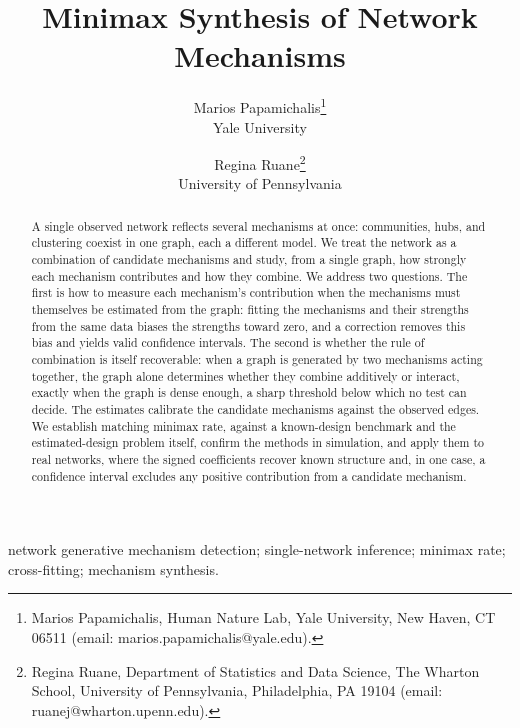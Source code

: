 \documentclass[12pt]{article}
\newif\ifblind\blindfalse %
\newcommand{\1}{\mathbf{1}}
\begin{document}
\sloppy

\singlespacing

\title{Minimax Synthesis of Network Mechanisms}

\ifblind
\author{}
\else
\author{Marios Papamichalis\thanks{Marios Papamichalis, Human Nature Lab, Yale University, New Haven, CT 06511 (email: marios.papamichalis@yale.edu).} \\ Yale University \and Regina Ruane\thanks{Regina Ruane, Department of Statistics and Data Science, The Wharton School, University of Pennsylvania, Philadelphia, PA 19104 (email: ruanej@wharton.upenn.edu).} \\ University of Pennsylvania}
\fi
\date{}


\maketitle

\begin{abstract}%
A single observed network reflects several mechanisms at once: communities, hubs, and clustering coexist in one graph, each a different model. We treat the
network as a combination of candidate mechanisms and study, from a single graph, how strongly each mechanism contributes and how they combine. We address two questions. The first
is how to measure each mechanism's contribution when the mechanisms must themselves be estimated from
the graph: fitting the mechanisms and their strengths from the same data biases the strengths toward zero, and a correction removes this bias and yields valid confidence intervals. The
second is whether the rule of combination is itself recoverable: when a graph is generated by two
mechanisms acting together, the graph alone determines whether they combine additively or interact, exactly when the graph is dense enough, a sharp threshold below which no test can decide. The estimates calibrate the candidate mechanisms against the observed edges. We establish matching minimax rate, against a known-design benchmark and the estimated-design problem itself, confirm the methods in simulation, and apply them to real networks, where the signed coefficients recover known structure and, in one case, a confidence interval excludes any positive contribution from a candidate mechanism.
\end{abstract}

\bigskip{} network generative mechanism detection; single-network inference; minimax rate; cross-fitting; mechanism synthesis.\par
\end{document}

